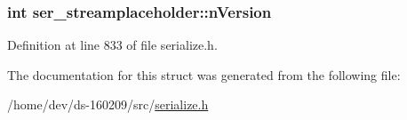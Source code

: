\subsubsection[{n\+Version}]{\setlength{\rightskip}{0pt plus 5cm}int ser\+\_\+streamplaceholder\+::n\+Version}\label{structser__streamplaceholder_adcc5fb4893156366e8491e37c59ecd87}


Definition at line 833 of file serialize.\+h.



The documentation for this struct was generated from the following file\+:\begin{DoxyCompactItemize}
\item 
/home/dev/ds-\/160209/src/\hyperlink{serialize_8h}{serialize.\+h}\end{DoxyCompactItemize}
